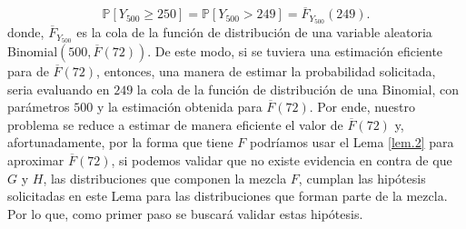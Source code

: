\documentclass[10.5pt,notitlepage]{article}
\newcommand{\PP}{\mathbb{P}}
\theoremstyle{plain}
\begin{document}
\[
\PP[Y_{500} \geq 250] = \PP[Y_{500} > 249] = \overline{F}_{Y_{500}}(249). 
\]
donde, \(\overline{F}_{Y_{500}}\) es la cola de la función de distribución de una variable aleatoria Binomial\((500, \overline{F}(72))\). De este modo, si se tuviera una estimación eficiente para de \(\overline{F}(72)\), entonces, una manera de estimar la probabilidad solicitada, seria evaluando en \(249\) la cola de la función de distribución de una Binomial, con parámetros \(500\) y la estimación obtenida para \(\overline{F}(72)\). Por ende, nuestro problema se reduce a estimar de manera eficiente el valor de \(\overline{F}(72)\) y, afortunadamente, por la forma que tiene \(F\) podríamos usar el Lema \ref{lem.2} para aproximar \(\overline{F}(72)\), si podemos validar que no existe evidencia en contra de que \(G\) y \(H\), las distribuciones que componen la mezcla \(F\), cumplan las hipótesis solicitadas en este Lema para las distribuciones que forman parte de la mezcla. Por lo que, como primer paso se buscará validar estas hipótesis.
\end{document}
